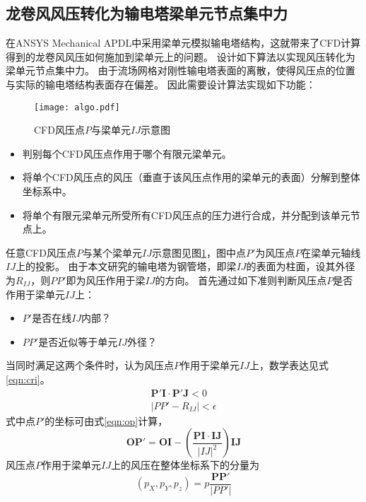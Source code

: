 \subsection{龙卷风风压转化为输电塔梁单元节点集中力}
在ANSYS Mechanical APDL中采用梁单元模拟输电塔结构，这就带来了CFD计算得到的龙卷风风压如何施加到梁单元上的问题。
设计如下算法以实现风压转化为梁单元节点集中力。
由于流场网格对刚性输电塔表面的离散，使得风压点的位置与实际的输电塔结构表面存在偏差。
因此需要设计算法实现如下功能：

\begin{figure}[!htbp]
	\centering
	\texttt{[image: algo.pdf]}
	\caption{CFD风压点$P$与梁单元$IJ$示意图}
	\label{fig:algo}
\end{figure}

\begin{itemize}
	\item 判别每个CFD风压点作用于哪个有限元梁单元。
	\item 将单个CFD风压点的风压（垂直于该风压点作用的梁单元的表面）分解到整体坐标系中。
	\item 将单个有限元梁单元所受所有CFD风压点的压力进行合成，并分配到该单元节点上。
\end{itemize}

任意CFD风压点$P$与某个梁单元$IJ$示意图见图\ref{fig:algo}，图中点$P'$为风压点$P$在梁单元轴线$IJ$上的投影。
由于本文研究的输电塔为钢管塔，即梁$IJ$的表面为柱面，设其外径为$R_{IJ}$，则$PP'$即为风压作用于梁$IJ$的方向。
首先通过如下准则判断风压点$P$是否作用于梁单元$IJ$上：

\begin{itemize}
	\item $P'$是否在线$IJ$内部？
	\item $PP'$是否近似等于单元$IJ$外径？
\end{itemize}
当同时满足这两个条件时，认为风压点$P$作用于梁单元$IJ$上，数学表达见式\eqref{eqn:cri}。
\begin{gather}\label{eqn:cri}
	\bm{P'I}\cdot\bm{P'J} < 0  \nonumber \\
	|PP'-R_{IJ}| < \epsilon
\end{gather}
式中点$P'$的坐标可由式\eqref{eqn:op}计算，
\begin{equation}\label{eqn:op}
	\bm{OP'}=\bm{OI} - \left( \frac{\bm{PI}\cdot\bm{IJ}}{|IJ|^2} \right)\bm{IJ}
\end{equation}
风压点$P$作用于梁单元$IJ$上的风压在整体坐标系下的分量为
\begin{equation}
	(p_X, p_Y, p_z) = p\frac{\bm{PP'}}{|PP'|}
\end{equation}

